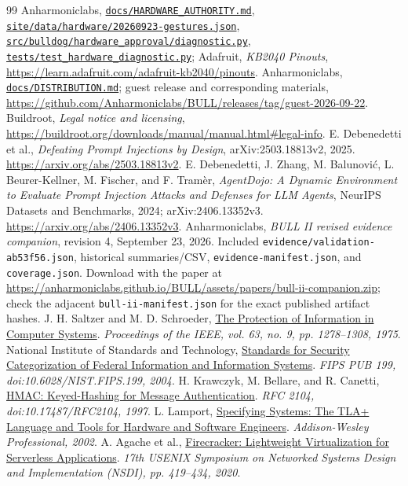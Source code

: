 \documentclass[journal]{IEEEtran}
\newcommand{\repo}[1]{\href{https://github.com/Anharmoniclabs/BULL/blob/ab53f563bcbcaf60820acb318b8212796ce502ff/#1}{\nolinkurl{#1}}}
\newcommand{\ev}[1]{\nolinkurl{#1}}
\begin{document}
\begin{thebibliography}{99}
 Anharmoniclabs, \repo{docs/HARDWARE_AUTHORITY.md}, \repo{site/data/hardware/20260923-gestures.json}, \repo{src/bulldog/hardware_approval/diagnostic.py}, \repo{tests/test_hardware_diagnostic.py}; Adafruit, \emph{KB2040 Pinouts}, \url{https://learn.adafruit.com/adafruit-kb2040/pinouts}.
 Anharmoniclabs, \repo{docs/DISTRIBUTION.md}; guest release and corresponding materials, \url{https://github.com/Anharmoniclabs/BULL/releases/tag/guest-2026-09-22}. Buildroot, \emph{Legal notice and licensing}, \url{https://buildroot.org/downloads/manual/manual.html#legal-info}.
 E. Debenedetti et al., \emph{Defeating Prompt Injections by Design}, arXiv:2503.18813v2, 2025. \url{https://arxiv.org/abs/2503.18813v2}.
 E. Debenedetti, J. Zhang, M. Balunovi\'{c}, L. Beurer-Kellner, M. Fischer, and F. Tram\`er, \emph{AgentDojo: A Dynamic Environment to Evaluate Prompt Injection Attacks and Defenses for LLM Agents}, NeurIPS Datasets and Benchmarks, 2024; arXiv:2406.13352v3. \url{https://arxiv.org/abs/2406.13352v3}.
 Anharmoniclabs, \emph{BULL II revised evidence companion}, revision 4, September 23, 2026. Included \ev{evidence/validation-ab53f56.json}, historical summaries/CSV, \ev{evidence-manifest.json}, and \ev{coverage.json}. Download with the paper at \url{https://anharmoniclabs.github.io/BULL/assets/papers/bull-ii-companion.zip}; check the adjacent \ev{bull-ii-manifest.json} for the exact published artifact hashes.
 J. H. Saltzer and M. D. Schroeder, \href{https://web.mit.edu/Saltzer/www/publications/protection/}{The Protection of Information in Computer Systems}. \textit{Proceedings of the IEEE, vol. 63, no. 9, pp. 1278--1308, 1975}.
 National Institute of Standards and Technology, \href{https://csrc.nist.gov/pubs/fips/199/final}{Standards for Security Categorization of Federal Information and Information Systems}. \textit{FIPS PUB 199, doi:10.6028/NIST.FIPS.199, 2004}.
 H. Krawczyk, M. Bellare, and R. Canetti, \href{https://www.rfc-editor.org/rfc/rfc2104.html}{HMAC: Keyed-Hashing for Message Authentication}. \textit{RFC 2104, doi:10.17487/RFC2104, 1997}.
 L. Lamport, \href{https://lamport.azurewebsites.net/tla/book.html}{Specifying Systems: The TLA+ Language and Tools for Hardware and Software Engineers}. \textit{Addison-Wesley Professional, 2002}.
 A. Agache et al., \href{https://www.usenix.org/conference/nsdi20/presentation/agache}{Firecracker: Lightweight Virtualization for Serverless Applications}. \textit{17th USENIX Symposium on Networked Systems Design and Implementation (NSDI), pp. 419--434, 2020}.
\end{thebibliography}
\end{document}
